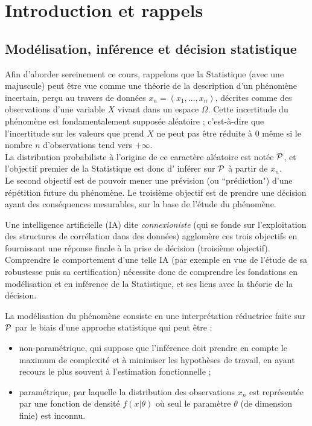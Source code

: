 \section{Introduction et rappels}\label{sec:intro}

\subsection{Modélisation, inférence et décision statistique}

Afin d'aborder sereinement ce cours, rappelons que la Statistique (avec une majuscule) peut \^etre vue comme une théorie de la description d'un {phénomène incertain}, per\c cu au travers de données ${ x_n}=(x_{1},\ldots,x_n)$, décrites comme des  { observations} d'une variable $X$ vivant dans un espace $\Omega$. Cette incertitude du phénomène est fondamentalement supposée {aléatoire} ; c'est-à-dire que l'incertitude sur les valeurs que prend $X$ ne peut pas \^etre réduite à 0 m\^eme si le nombre $n$ d'observations tend vers $+\infty$. \\

La distribution probabiliste à l'origine de ce caractère aléatoire est notée ${\cal{P}}$, et l'{objectif premier} de la Statistique est donc d'{ inférer} sur ${\cal{P}}$ à partir de ${ x_n}$. \\

Le { second objectif} est de pouvoir { mener une prévision} (ou ``prédiction") d'une répétition future du phénomène. Le { troisième objectif} est de { prendre une décision} ayant des conséquences mesurables, sur la base de l'étude du phénomène.  \\



\begin{remark}
Une intelligence artificielle (IA) dite {\it connexioniste} (qui se fonde sur l'exploitation des structures de corrélation dans des données) agglomère ces trois objectifs en fournissant une réponse finale à la prise de décision (troisième objectif). Comprendre le comportement d'une telle IA (par exemple en vue de l'étude de sa robustesse puis sa certification) nécessite donc de comprendre les fondations en modélisation et en inférence de la Statistique, et ses liens avec la théorie de la décision. \\
\end{remark}

La modélisation  du phénomène consiste en une {interprétation réductrice} faite sur ${\cal{P}}$ par le biais d'une approche statistique qui peut \^etre :
\begin{itemize}
\item { non-paramétrique}, qui suppose que l'inférence doit prendre en compte le maximum de complexité et à minimiser les hypothèses de travail, en ayant recours le plus souvent à l'estimation fonctionnelle ; 
\item { paramétrique}, par laquelle la distribution des observations ${ x_n}$ est représentée par une fonction de densité $f(x|\theta)$ où seul le paramètre $\theta$ (de dimension finie) est inconnu.
\end{itemize}

